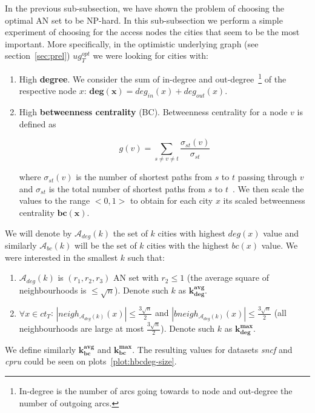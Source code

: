 		In the previous sub-subsection, we have shown the problem of choosing the optimal AN set to be NP-hard. In this sub-subsection we perform a simple experiment of choosing for the access nodes the cities that seem to be the most important. More specifically, in the optimistic underlying graph (see section~\ref{sec:prel}) $ug_{T}^{opt}$ we were looking for cities with:
		\begin{enumerate}
			\item High \textbf{degree}. We consider the sum of in-degree and out-degree~\footnote{In-degree is the number of arcs going towards to node and out-degree the number of outgoing arcs.} of the respective node $x$: $\bm{deg(x)} = deg_{in}(x) + deg_{out}(x)$.
			\item High \textbf{betweenness centrality} (BC). Betweenness centrality for a node $v$ is defined as 
			
			$$g(v) = \sum_{s \neq v \neq t} \frac{\displaystyle \sigma_{st}(v)}{\displaystyle \sigma_{st}}$$
			
			where $\sigma_{st}(v)$ is the number of shortest paths from $s$ to $t$ passing through $v$ and $\sigma_{st}$ is the total number of shortest paths from $s$ to $t$~\cite{centrality01}. We then scale the values to the range $<0, 1>$ to obtain for each city $x$ its scaled betweenness centrality $\bm{bc(x)}$.
		\end{enumerate}
		\hspace*{\fill}
		
		\noindent We will denote by $\mathcal{A}_{deg}(k)$ the set of $k$ cities with highest $deg(x)$ value and similarly $\mathcal{A}_{bc}(k)$ will be the set of $k$ cities with the highest $bc(x)$ value. We were interested in the smallest $k$ such that:
		\begin{enumerate}
			\item $\mathcal{A}_{deg}(k)$ is $(r_{1}, r_{2}, r_{3})$ AN set with $r_{2} \leq 1$ (the average square of neighbourhoods is $\leq \sqrt{n}$). Denote such $k$ as $\bm{k_{deg}^{avg}}$.
			\item $\forall x \in ct_{T}$: $|neigh_{\mathcal{A}_{deg}(k)}(x)| \leq \frac{3\sqrt{n}}{2}$ and $|bneigh_{\mathcal{A}_{deg}(k)}(x)| \leq \frac{3\sqrt{n}}{2}$ (all neighbourhoods are large at most $\frac{3\sqrt{n}}{2}$). Denote such $k$ as $\bm{k_{deg}^{max}}$.
		\end{enumerate}		 
		\hspace*{\fill}
		
		\noindent We define similarly $\bm{k_{bc}^{avg}}$ and $\bm{k_{bc}^{max}}$. The resulting values for datasets \textit{sncf} and \textit{cpru} could be seen on plots~\ref{plot:hbcdeg-size}.
		
